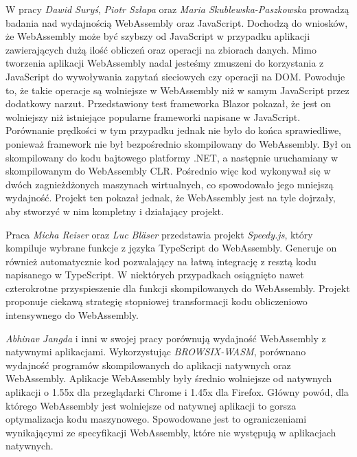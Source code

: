 \documentclass[language=polish,type=master]{aghmodern}
\begin{document}
W pracy \cite{wasm_blazor} \emph{Dawid Suryś}, \emph{Piotr Szłapa} oraz \emph{Maria Skublewska-Paszkowska} prowadzą badania nad wydajnością WebAssembly oraz JavaScript.
Dochodzą do wniosków, że WebAssembly może być szybszy od JavaScript w przypadku aplikacji zawierających dużą ilość obliczeń oraz operacji na zbiorach danych.
Mimo tworzenia aplikacji WebAssembly nadal jesteśmy zmuszeni do korzystania z JavaScript do wywoływania zapytań sieciowych czy operacji na DOM\footnotemark{}.
Powoduje to, że takie operacje są wolniejsze w WebAssembly niż w samym JavaScript przez dodatkowy narzut.
Przedstawiony test frameworka Blazor\footnotemark{} pokazał, że jest on wolniejszy niż istniejące popularne frameworki napisane w JavaScript.
Porównanie prędkości w tym przypadku jednak nie było do końca sprawiedliwe, ponieważ framework nie był bezpośrednio skompilowany do WebAssembly.
Był on skompilowany do kodu bajtowego platformy .NET, a następnie uruchamiany w skompilowanym do WebAssembly CLR\footnotemark{}.
Pośrednio więc kod wykonywał się w dwóch zagnieżdżonych maszynach wirtualnych, co spowodowało jego mniejszą wydajność.
Projekt ten pokazał jednak, że WebAssembly jest na tyle dojrzały, aby stworzyć w nim kompletny i działający projekt.

Praca \cite{wasm_speedyjs} \emph{Micha Reiser} oraz \emph{Luc Bl\"{a}ser} przedstawia projekt \emph{Speedy.js}, który kompiluje wybrane funkcje z języka TypeScript\footnotemark{} do WebAssembly.
Generuje on również automatycznie kod pozwalający na łatwą integrację z resztą kodu napisanego w TypeScript.
W niektórych przypadkach osiągnięto nawet czterokrotne przyspieszenie dla funkcji skompilowanych do WebAssembly.
Projekt proponuje ciekawą strategię stopniowej transformacji kodu obliczeniowo intensywnego do WebAssembly.

\emph{Abhinav Jangda} i inni w swojej pracy \cite{wasm_native} porównują wydajność WebAssembly z natywnymi aplikacjami.
Wykorzystując \emph{BROWSIX-WASM}\footnotemark{}, porównano wydajność programów skompilowanych do aplikacji natywnych oraz WebAssembly.
Aplikacje WebAssembly były średnio wolniejsze od natywnych aplikacji o 1.55x dla przeglądarki Chrome i 1.45x dla Firefox.
Główny powód, dla którego WebAssembly jest wolniejsze od natywnej aplikacji to gorsza optymalizacja kodu maszynowego.
Spowodowane jest to ograniczeniami wynikającymi ze specyfikacji WebAssembly, które nie występują w aplikacjach natywnych.
\end{document}
